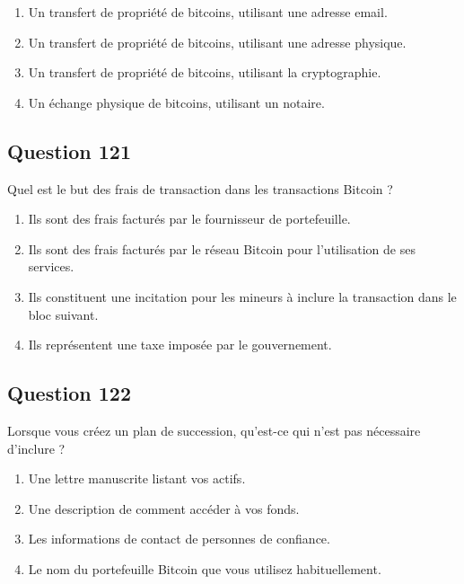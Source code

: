 \documentclass[12pt,a4paper]{article}
\begin{document}
\begin{enumerate}[label=\Alph*., leftmargin=*]
\item Un transfert de propriété de bitcoins, utilisant une adresse email.
\item Un transfert de propriété de bitcoins, utilisant une adresse physique.
\item Un transfert de propriété de bitcoins, utilisant la cryptographie.
\item Un échange physique de bitcoins, utilisant un notaire.
\end{enumerate}

\bigskip


\subsection*{Question 121}
Quel est le but des frais de transaction dans les transactions Bitcoin ?

\begin{enumerate}[label=\Alph*., leftmargin=*]
\item Ils sont des frais facturés par le fournisseur de portefeuille.
\item Ils sont des frais facturés par le réseau Bitcoin pour l'utilisation de ses services.
\item Ils constituent une incitation pour les mineurs à inclure la transaction dans le bloc suivant.
\item Ils représentent une taxe imposée par le gouvernement.
\end{enumerate}

\bigskip


\subsection*{Question 122}
Lorsque vous créez un plan de succession, qu'est-ce qui n'est pas nécessaire d'inclure ?

\begin{enumerate}[label=\Alph*., leftmargin=*]
\item Une lettre manuscrite listant vos actifs.
\item Une description de comment accéder à vos fonds.
\item Les informations de contact de personnes de confiance.
\item Le nom du portefeuille Bitcoin que vous utilisez habituellement.
\end{enumerate}

\bigskip
\end{document}
